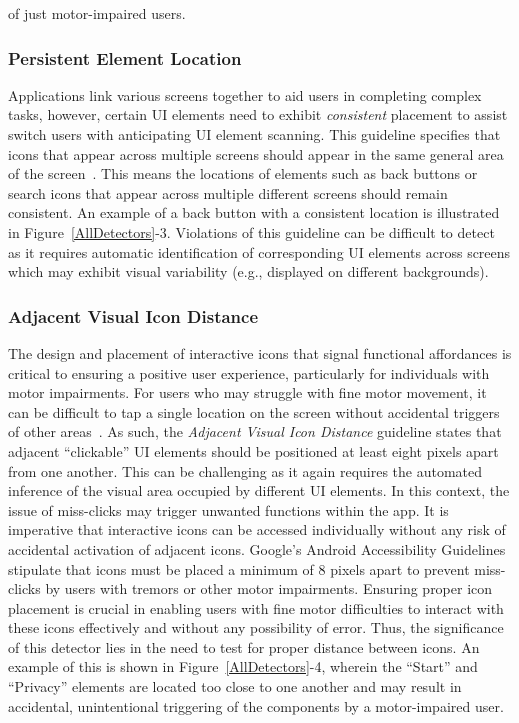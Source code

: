  of just motor-impaired users. 
\vspace{-0.5em}
\subsubsection{Persistent Element Location}

Applications link various screens together to aid users in completing complex tasks, however, certain UI elements need to exhibit \textit{consistent} placement to assist switch users with anticipating UI element scanning. This guideline specifies that icons that appear across multiple screens should appear in the same general area of the screen~\cite{AppleAccess,GoogleAccess}. This means the locations of elements such as back buttons or search icons that appear across multiple different screens should remain consistent. An example of a back button with a consistent location is illustrated in Figure~\ref{AllDetectors}-3. Violations of this guideline can be difficult to detect as it requires automatic identification of corresponding UI elements across screens which may exhibit visual variability (e.g., displayed on different backgrounds).


\subsubsection{Adjacent Visual Icon Distance}

The design and placement of interactive icons that signal functional affordances is critical to ensuring a positive user experience, particularly for individuals with motor impairments. For users who may struggle with fine motor movement, it can be difficult to tap a single location on the screen without accidental triggers of other areas~\cite{Kong21}. As such, the \textit{Adjacent Visual Icon Distance} guideline states that adjacent ``clickable'' UI elements should be positioned at least eight pixels apart from one another.  This can be challenging as it again requires the automated inference of the visual area occupied by different UI elements. In this context, the issue of miss-clicks may trigger unwanted functions within the app. It is imperative that interactive icons can be accessed individually without any risk of accidental activation of adjacent icons. Google's Android Accessibility Guidelines \cite{GoogleAccess} stipulate that icons must be placed a minimum of 8 pixels apart to prevent miss-clicks by users with tremors or other motor impairments. Ensuring proper icon placement is crucial in enabling users with fine motor difficulties to interact with these icons effectively and without any possibility of error. Thus, the significance of this detector lies in the need to test for proper distance between icons.
An example of this is shown in Figure~\ref{AllDetectors}-4, wherein the ``Start'' and ``Privacy'' elements are located too close to one another and may result in accidental, unintentional triggering of the components by a motor-impaired user.

